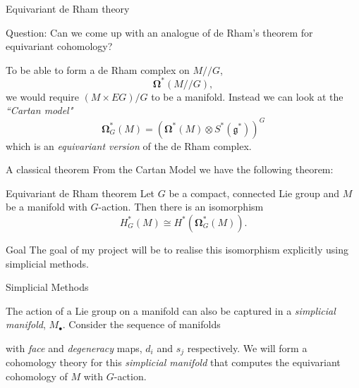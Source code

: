 \documentclass{beamer}
\newcommand{\omg}[1]{\boldsymbol{\Omega}^{#1}}
\begin{document}
\begin{frame}{Equivariant de Rham theory}
\begin{block}{Question:}
Can we come up with an analogue of de Rham's theorem for equivariant cohomology? 
\end{block}
To be able to form a de Rham complex on $M//G$,
\[
\omg{*}(M//G),
\]
 we would require $(M \times EG)/G$ to be a manifold. Instead we can look at the \emph{``Cartan model"}
 \[
 \omg{*}_G(M)=(\omg{*}(M) \otimes S^*(\mathfrak{g}^*))^G
 \]
 which is an \emph{equivariant version} of the de Rham complex.
\end{frame}



\begin{frame}{A classical theorem}
From the Cartan Model we have the following theorem:
\begin{block}{Equivariant de Rham theorem}
Let $G$ be a compact, connected Lie group and $M$ be a manifold with $G$-action. Then there is an isomorphism
\[
H^{*}_G(M) \cong H^{*}(\omg{*}_G(M)).
\]
\end{block}
\begin{alertblock}{Goal}
The goal of my project will be to realise this isomorphism explicitly using simplicial methods.
\end{alertblock}
\end{frame}



\begin{frame}{Simplicial Methods}

The action of a Lie group on a manifold can also be captured in a \emph{simplicial manifold}, $M_{\bullet}$. Consider the sequence of manifolds
\begin{center}
\end{center}
with \emph{face} and \emph{degeneracy} maps, $d_i$ and $s_j$ respectively. We will form a cohomology theory for this \emph{simplicial manifold} that computes the equivariant cohomology of $M$ with $G$-action.
\end{frame}
\end{document}
